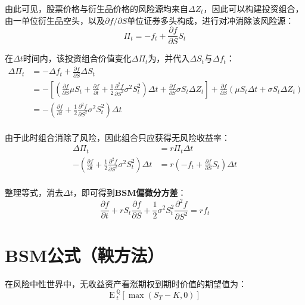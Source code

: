 \documentclass[11pt]{article}
\def\E{{\textrm{E}}\,}
\begin{document}
由此可见，股票价格与衍生品价格的风险源均来自$\Delta Z_t$，因此可以构建投资组合，由一单位衍生品空头，以及$\partial f/\partial S$单位证券多头构成，进行对冲消除该风险源：
\begin{equation*}
    \Pi_t = -f_t + \frac{\partial f}{\partial S} S_t
\end{equation*}

在$\Delta t$时间内，该投资组合价值变化$\Delta \Pi_t$为，并代入$\Delta S_t$与$\Delta f_t$：
\begin{align*}
    \Delta \Pi_t & = -\Delta f_t + \frac{\partial f}{\partial S} \Delta S_t \\
    & = -\left[ \left(\frac{\partial f}{\partial S} \mu S_t  + \frac{\partial f}{\partial t} + \frac{1}{2}\frac{\partial^2 f}{\partial S^2} \sigma^2 S_t^2 \right) \Delta t + \frac{\partial f}{\partial S} \sigma S_t \Delta Z_t \right] + \frac{\partial f}{\partial S} \left( \mu S_t \Delta t + \sigma S_t \Delta Z_t \right) \\
    & = -\left( \frac{\partial f}{\partial t} + \frac{1}{2}\frac{\partial^2 f}{\partial S^2} \sigma^2 S_t^2 \right) \Delta t \\
\end{align*}

由于此时组合消除了风险，因此组合只应获得无风险收益率：
\begin{align*}
    \Delta \Pi_t & = r \Pi_t \Delta t \\
    -\left( \frac{\partial f}{\partial t} + \frac{1}{2}\frac{\partial^2 f}{\partial S^2} \sigma^2 S_t^2 \right) \Delta t & =  r \left( -f_t + \frac{\partial f}{\partial S} S_t \right) \Delta t \\
\end{align*}

整理等式，消去$\Delta t$，即可得到\textbf{BSM偏微分方差}：
\begin{equation*}
    \frac{\partial f}{\partial t} + r S_t \frac{\partial f}{\partial S} + \frac{1}{2} \sigma^2 S_t^2 \frac{\partial^2 f}{\partial S^2} = r f_t
\end{equation*}

\section{BSM公式（鞅方法）}

在风险中性世界中，无收益资产看涨期权到期时价值的期望值为：
\begin{equation*}
    \E^\mathbb{Q}_t \left[ \max(S_T-K,0) \right]
\end{equation*}
\end{document}
